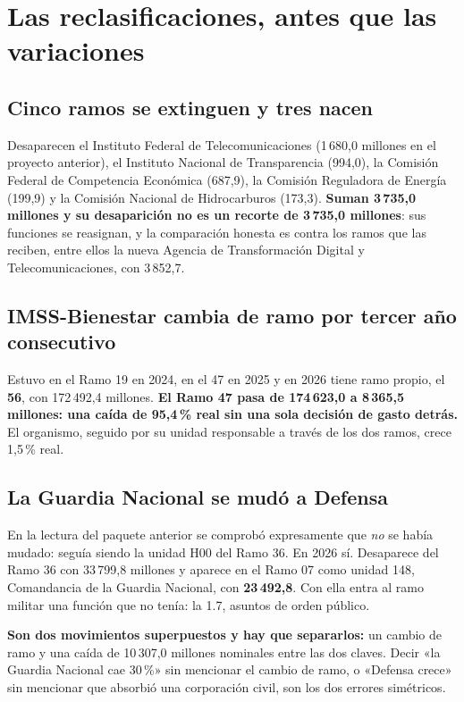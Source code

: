 

\section{Las reclasificaciones, antes que las variaciones}

\subsection{Cinco ramos se extinguen y tres nacen}

Desaparecen el Instituto Federal de Telecomunicaciones (1\,680,0 millones en el proyecto
anterior), el Instituto Nacional de Transparencia (994,0), la Comisión Federal de Competencia
Económica (687,9), la Comisión Reguladora de Energía (199,9) y la Comisión Nacional de
Hidrocarburos (173,3). \textbf{Suman 3\,735,0 millones y su desaparición no es un recorte de
3\,735,0 millones}: sus funciones se reasignan, y la comparación honesta es contra los ramos
que las reciben, entre ellos la nueva Agencia de Transformación Digital y Telecomunicaciones,
con 3\,852,7.

\subsection{IMSS-Bienestar cambia de ramo por tercer año consecutivo}

Estuvo en el Ramo 19 en 2024, en el 47 en 2025 y en 2026 tiene ramo propio, el \textbf{56},
con 172\,492,4 millones. \textbf{El Ramo 47 pasa de 174\,623,0 a 8\,365,5 millones: una caída
de 95,4\,\% real sin una sola decisión de gasto detrás.} El organismo, seguido por su unidad
responsable a través de los dos ramos, crece 1,5\,\% real.

\subsection{La Guardia Nacional se mudó a Defensa}

En la lectura del paquete anterior se comprobó expresamente que \emph{no} se había mudado:
seguía siendo la unidad H00 del Ramo 36. En 2026 sí. Desaparece del Ramo 36 con 33\,799,8
millones y aparece en el Ramo 07 como unidad 148, Comandancia de la Guardia Nacional, con
\textbf{23\,492,8}. Con ella entra al ramo militar una función que no tenía: la 1.7, asuntos
de orden público.

\textbf{Son dos movimientos superpuestos y hay que separarlos:} un cambio de ramo y una caída
de 10\,307,0 millones nominales entre las dos claves. Decir «la Guardia Nacional cae 30\,\%»
sin mencionar el cambio de ramo, o «Defensa crece» sin mencionar que absorbió una corporación
civil, son los dos errores simétricos.

